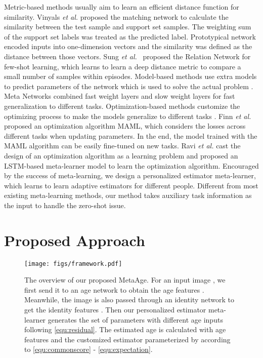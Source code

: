 \documentclass[journal,twoside]{IEEEtran}
\begin{document}
Metric-based methods usually aim to learn an efficient distance function for similarity.
Vinyals \emph{et al.} \cite{vinyals2016matching} proposed the matching network to calculate the similarity between the test sample and support set samples. The weighting sum of the support set labels was treated as the predicted label.
Prototypical network \cite{snell2017prototypical} encoded inputs into one-dimension vectors and the similarity was defined as the distance between those vectors. Sung \emph{et al.}~\cite{sung2018learning} proposed the Relation Network for few-shot learning, which learns to learn a deep distance metric to compare a small number of samples within episodes.
Model-based methods use extra models to predict parameters of the network which is used to solve the actual problem \cite{jia2016dynamic}. Meta Networks \cite{munkhdalai2017meta} combined fast weight layers and slow weight layers for fast generalization to different tasks. Optimization-based methods customize the optimizing process to make the models generalize to different tasks \cite{andrychowicz2016learning}. Finn \emph{et al.} \cite{finn2017model} proposed an optimization algorithm MAML, which considers the losses across different tasks when updating parameters. In the end, the model trained with the MAML algorithm can be easily fine-tuned on new tasks. Ravi \emph{et al.} \cite{ravi2016optimization} cast the design of an optimization algorithm as a learning problem and proposed an LSTM-based meta-learner model to learn the optimization algorithm.
Encouraged by the success of meta-learning, we design a personalized estimator meta-learner, which learns to learn adaptive estimators for different people. Different from most existing meta-learning methods, our method takes auxiliary task information as the input to handle the zero-shot issue.

\section{Proposed Approach}

\begin{figure*}[t]
\begin{center}
   \texttt{[image: figs/framework.pdf]}
\end{center}
   \caption{The overview of our proposed MetaAge. For an input image , we first send it to an age network  to obtain the age features . Meanwhile, the image  is also passed through an identity network  to get the identity features . Then our personalized estimator meta-learner generates the set of parameters  with different age inputs following \eqref{equ:residual}. The estimated age is calculated with age features  and the customized estimator parameterized by  according to \eqref{equ:commonscore} - \eqref{equ:expectation}.}
\label{fig:flowchart}
\end{figure*}
\end{document}
